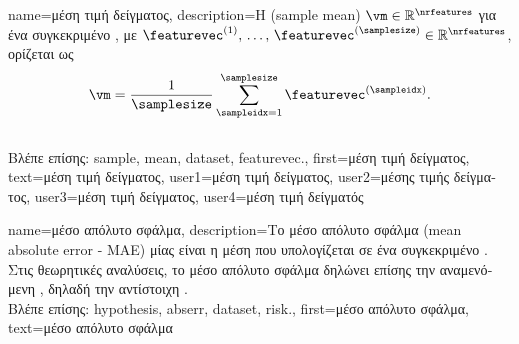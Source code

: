 {name={\foreignlanguage{greek}{μέση τιμή δείγματος}}, 
	description={\foreignlanguage{greek}{Η}  
		 (sample mean) $\vm \in \mathbb{R}^{\nrfeatures}$ \foreignlanguage{greek}{για ένα συγκεκριμένο} 
		, \foreignlanguage{greek}{με}  
		$\featurevec^{(1)}, \,\ldots, \,\featurevec^{(\samplesize)} \in \mathbb{R}^{\nrfeatures}$, 
		\foreignlanguage{greek}{ορίζεται ως}  
		$$\vm = \frac{1}{\samplesize} \sum_{\sampleidx=1}^{\samplesize} \featurevec^{(\sampleidx)}.$$
		\\
		\foreignlanguage{greek}{Βλέπε επίσης:} \gls{sample}, \gls{mean}, \gls{dataset}, \gls{featurevec}.},
	first={\foreignlanguage{greek}{μέση τιμή δείγματος}},
	text={\foreignlanguage{greek}{μέση τιμή δείγματος}},
	user1={\foreignlanguage{greek}{μέση τιμή δείγματος}}, %
	user2={\foreignlanguage{greek}{μέσης τιμής δείγματος}}, %
	user3={\foreignlanguage{greek}{μέση τιμή δείγματος}}, %
	user4={\foreignlanguage{greek}{μέση τιμή δείγματός}} %
}

{name={\foreignlanguage{greek}{μέσο απόλυτο σφάλμα}}, 
	description={\foreignlanguage{greek}{Το μέσο απόλυτο σφάλμα} 
		(mean absolute error - MAE) \foreignlanguage{greek}{μίας}  \foreignlanguage{greek}{είναι η μέση}
        		 \foreignlanguage{greek}{που υπολογίζεται σε ένα συγκεκριμένο} . 
               	\foreignlanguage{greek}{Στις θεωρητικές αναλύσεις, το μέσο απόλυτο σφάλμα δηλώνει επίσης την αναμενόμενη} 
		, \foreignlanguage{greek}{δηλαδή την αντίστοιχη} .
		\\ 
		\foreignlanguage{greek}{Βλέπε επίσης:} \gls{hypothesis}, \gls{abserr}, \gls{dataset}, \gls{risk}.}, 
 	first={\foreignlanguage{greek}{μέσο απόλυτο σφάλμα}}, 
 	text={\foreignlanguage{greek}{μέσο απόλυτο σφάλμα}}
}

